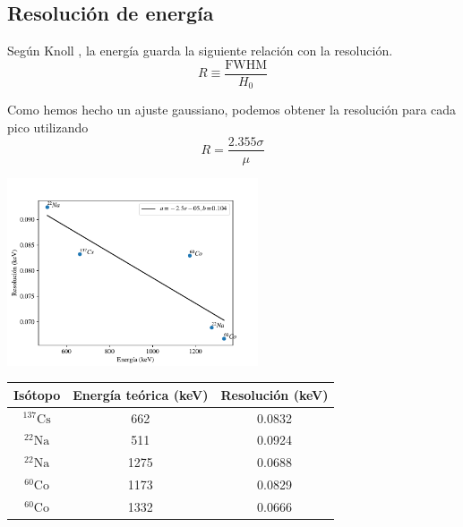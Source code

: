\documentclass[a4paper, onecolumn]{article}
\begin{document}
		\subsection{Resolución de energía}

		Según Knoll \cite{knoll_radiation_2010}, la energía guarda la siguiente relación con la resolución.
		$$
		R \equiv \frac{\mathrm{FWHM}}{H_0}
		$$

		Como hemos hecho un ajuste gaussiano, podemos obtener la resolución para cada pico utilizando
		$$
		R = \frac{2.355\sigma}{\mu}
		$$

		\begin{center}
			\includegraphics[width=210pt]{img/resolution_vs_energy.pdf}
		\end{center}

		\begin{center}
			{\renewcommand{\arraystretch}{1.5}
			\renewcommand{\tabcolsep}{0.2cm}
			\label{table_energy_resolution}
			\begin{tabular}{ c c c  }
				\hline
				Isótopo & Energía teórica (keV) & Resolución (keV) \\
				\hline
				${}^{137}\mathrm{Cs}$ & 662 & 0.0832\\ 
				${}^{22}\mathrm{Na}$  & 511 & 0.0924\\ 
				${}^{22}\mathrm{Na}$  & 1275 & 0.0688 \\ 
				${}^{60}\mathrm{Co}$ & 1173 & 0.0829 \\ 
				${}^{60}\mathrm{Co}$  & 1332 & 0.0666
			\end{tabular}}
		\end{center}
\end{document}
